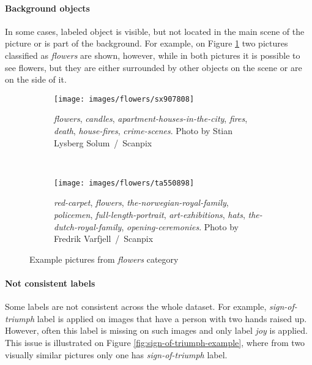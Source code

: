 \paragraph{Background objects}
In some cases, labeled object is visible, but not located in the main scene of the picture or is part of the background. For example, on Figure \ref{fig:image-flowers} two pictures classified as \textit{flowers} are shown, however, while in both pictures it is possible to see flowers, but they are either surrounded by other objects on the scene or are on the side of it.

\begin{figure}[ht!]
    \centering
    \begin{subfigure}[a]{0.45\textwidth}
        \texttt{[image: images/flowers/sx907808]}
        \caption{\textit{flowers}, \textit{candles}, \textit{apartment-houses-in-the-city}, \textit{fires}, \textit{death}, \textit{house-fires}, \textit{crime-scenes}. Photo by Stian Lysberg Solum~/~Scanpix}
    \end{subfigure}
    ~
    \begin{subfigure}[a]{0.45\textwidth}
        \texttt{[image: images/flowers/ta550898]}
        \caption{\textit{red-carpet}, \textit{flowers}, \textit{the-norwegian-royal-family}, \textit{policemen}, \textit{full-length-portrait}, \textit{art-exhibitions}, \textit{hats}, \textit{the-dutch-royal-family}, \textit{opening-ceremonies}. Photo by Fredrik Varfjell~/~Scanpix}
    \end{subfigure}
    \caption{Example pictures from \textit{flowers} category}
    \label{fig:image-flowers}
\end{figure}


\paragraph{Not consistent labels}
Some labels are not consistent across the whole dataset. For example, \textit{sign-of-triumph} label is applied on images that have a person with two hands raised up. However, often this label is missing on such images and only label \textit{joy} is applied. This issue is illustrated on Figure \ref{fig:sign-of-triumph-example}, where from two visually similar pictures only one has \textit{sign-of-triumph} label.

